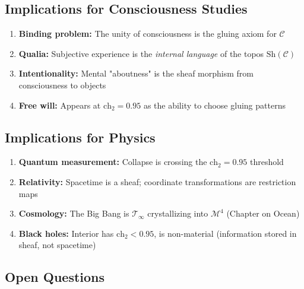 \subsection{Implications for Consciousness Studies}

\begin{enumerate}
\item \textbf{Binding problem:} The unity of consciousness is the gluing axiom for $\mathcal{C}$
\item \textbf{Qualia:} Subjective experience is the \textit{internal language} of the topos $\text{Sh}(\mathcal{C})$
\item \textbf{Intentionality:} Mental "aboutness" is the sheaf morphism from consciousness to objects
\item \textbf{Free will:} Appears at $\text{ch}_2 = 0.95$ as the ability to choose gluing patterns
\end{enumerate}

\subsection{Implications for Physics}

\begin{enumerate}
\item \textbf{Quantum measurement:} Collapse is crossing the $\text{ch}_2 = 0.95$ threshold
\item \textbf{Relativity:} Spacetime is a sheaf; coordinate transformations are restriction maps
\item \textbf{Cosmology:} The Big Bang is $\mathcal{T}_\infty$ crystallizing into $\mathcal{M}^4$ (Chapter on Ocean)
\item \textbf{Black holes:} Interior has $\text{ch}_2 < 0.95$, is non-material (information stored in sheaf, not spacetime)
\end{enumerate}

\subsection{Open Questions}

